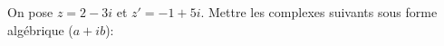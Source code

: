 \begin{exercice}
On pose $z=2-3i$ et $z'=-1+5i$. Mettre les complexes suivants
  sous forme alg\'ebrique ($a+ib$):\\
\noindent
{}\\
\noindent
{}
 
\end{exercice}
